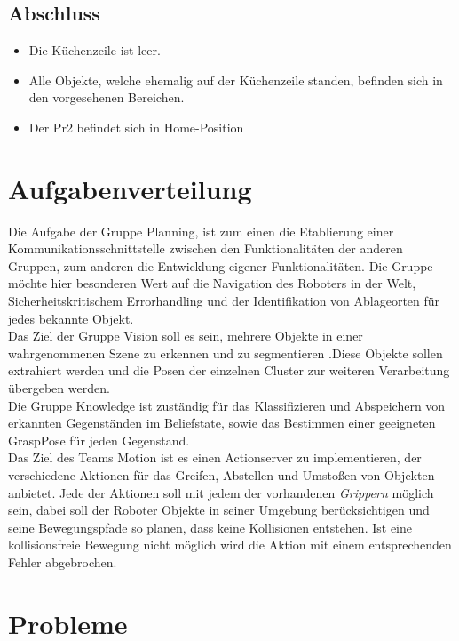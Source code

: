 \documentclass{suturo}
\begin{document}
\subsection{Abschluss}
\begin{itemize}
\item Die Küchenzeile ist leer.
\item Alle Objekte, welche ehemalig auf der Küchenzeile standen, befinden sich in den vorgesehenen Bereichen.
\item Der Pr2 befindet sich in Home-Position
\end{itemize}
\section{Aufgabenverteilung}
Die Aufgabe der Gruppe Planning, ist zum einen die Etablierung einer Kommunikationsschnittstelle zwischen den Funktionalitäten der anderen Gruppen, zum anderen die Entwicklung eigener Funktionalitäten. Die Gruppe möchte hier besonderen Wert auf die Navigation des Roboters in der Welt, Sicherheitskritischem Errorhandling und der Identifikation von Ablageorten für jedes bekannte Objekt. \\

Das Ziel der Gruppe Vision soll es sein, mehrere Objekte in einer wahrgenommenen Szene zu erkennen und zu segmentieren .Diese Objekte sollen extrahiert werden und die Posen der einzelnen Cluster zur weiteren Verarbeitung übergeben werden. \\

Die Gruppe Knowledge ist zuständig für das Klassifizieren und Abspeichern von erkannten Gegenständen im Beliefstate, sowie das Bestimmen einer geeigneten GraspPose für jeden Gegenstand.\\

Das Ziel des Teams Motion ist es einen Actionserver zu implementieren, der verschiedene Aktionen für das Greifen, Abstellen und Umstoßen von Objekten anbietet. Jede der Aktionen soll mit jedem der vorhandenen \textit{Grippern} möglich sein, dabei soll der Roboter Objekte in seiner Umgebung berücksichtigen und seine Bewegungspfade so planen, dass keine Kollisionen entstehen. Ist eine kollisionsfreie Bewegung nicht möglich wird die Aktion mit einem entsprechenden Fehler abgebrochen.\\

\section{Probleme}
\end{document}
